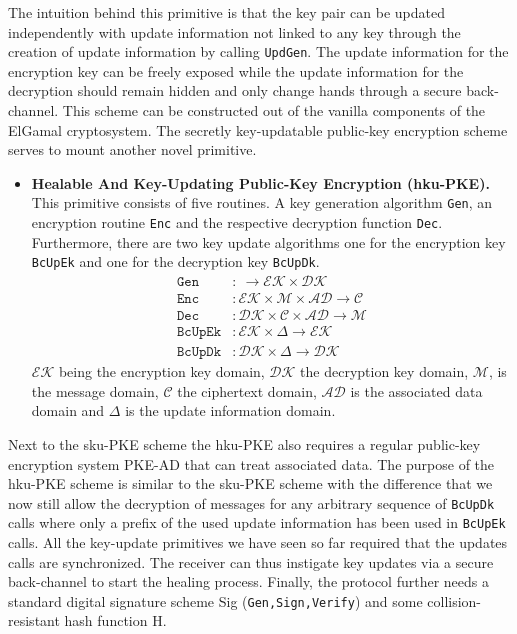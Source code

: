 \documentclass[11pt,a4paper,twoside,openright,bibliography=totoc]{scrbook}
\begin{document}
The intuition behind this primitive is that the key pair can be
updated independently with update information not linked to any
key through the creation of update information by calling
\texttt{UpdGen}. The update information for the encryption key can be freely
exposed while the update information for the decryption should
remain hidden and only change hands through a secure back-channel.
This scheme can be constructed out of the vanilla components
of the ElGamal cryptosystem. The secretly key-updatable public-key
encryption scheme serves to mount another novel primitive.
\begin{itemize}
\item \textbf{Healable And Key-Updating Public-Key Encryption (hku-PKE).} This
  primitive consists of five routines. A key generation algorithm \texttt{Gen},
  an encryption routine \texttt{Enc} and the respective decryption function
  \texttt{Dec}. Furthermore, there are two key update algorithms one
  for the encryption key \texttt{BcUpEk} and one for the decryption key \texttt{BcUpDk}.
  \begin{align*}
    \texttt{Gen} & : \ \rightarrow \mathcal{EK} \times \mathcal{DK} \\
    \texttt{Enc} & : \mathcal{EK} \times \mathcal{M} \times \mathcal{AD}
                   \rightarrow \mathcal{C} \\
    \texttt{Dec} & : \mathcal{DK} \times \mathcal{C} \times \mathcal{AD}
                   \rightarrow \mathcal{M} \\
    \texttt{BcUpEk} & : \mathcal{EK} \times \Delta \rightarrow \mathcal{EK} \\
    \texttt{BcUpDk} & : \mathcal{DK} \times \Delta \rightarrow \mathcal{DK}
  \end{align*}
  $\mathcal{EK}$ being the encryption key domain, $\mathcal{DK}$ the decryption
  key domain, $\mathcal{M}$, is the message domain, $\mathcal{C}$ the ciphertext
  domain, $\mathcal{AD}$ is the associated data domain
  and $\Delta$ is the update information domain.
\end{itemize}
Next to the sku-PKE scheme the hku-PKE also requires a regular public-key
encryption system PKE-AD that can treat associated data. The purpose
of the hku-PKE scheme is similar to the sku-PKE scheme with the
difference that we now still allow the decryption of messages for any
arbitrary sequence of \texttt{BcUpDk} calls where only a prefix of the
used update information has been used in \texttt{BcUpEk} calls. All
the key-update primitives we have seen so far required that the
updates calls are synchronized. The receiver can thus instigate key
updates via a secure back-channel to start the healing process.
Finally, the protocol further needs a standard digital signature
scheme Sig (\texttt{Gen,Sign,Verify}) and some collision-resistant
hash function H.
\end{document}
